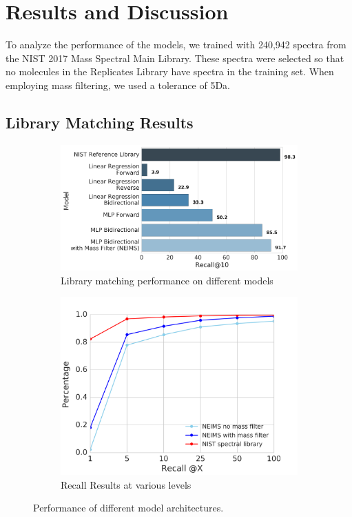 \section{Results and Discussion}
To analyze the performance of the models, we trained with 240,942 spectra from the NIST 2017 Mass Spectral Main Library. These spectra were selected so that no molecules in the Replicates Library have spectra in the training set. When employing mass filtering, we used a tolerance of 5Da. 

\subsection{Library Matching Results}
\label{sec:library-matching-results}
\begin{figure}[h]
    \centering
    \begin{subfigure}[b]{0.52\linewidth}
        \includegraphics[width=\linewidth]{all_models_w_massfilter.png}
        \caption[Library Matching Results]{Library matching performance on different models}
    \end{subfigure}
    \begin{subfigure}[b]{0.4\linewidth}
        \includegraphics[width=\linewidth]{recall_at_X.png}
        \caption[Recall@X Results for Different models]{Recall Results at various levels}
    \end{subfigure}
    \caption{Performance of different model architectures.}
    \label{fig:main_results_and_recall_results}
\end{figure}

